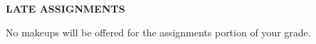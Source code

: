 \documentclass[12pt]{letter}
\begin{document}
\textbf{LATE ASSIGNMENTS} \par
No makeups will be offered for the assignments portion of your grade.




\end{document}
